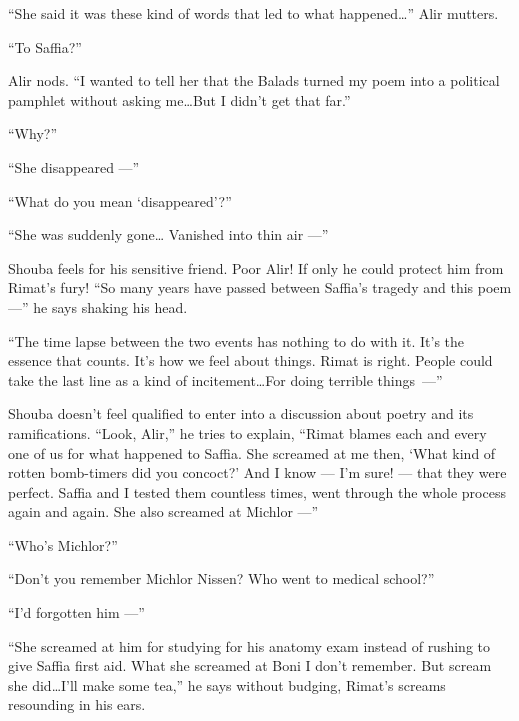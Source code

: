 \documentclass[twoside,11pt,openany]{book}
\begin{document}
``She said it was these kind of words that led to what happened{\ldots}'' Alir mutters.

``To Saffia?''

Alir nods. ``I wanted to tell her that the Balads turned my poem into a political pamphlet without asking
me{\ldots}But I didn't get that far.''

``Why?''

``She disappeared ---''

``What do you mean `disappeared'?''

``She was suddenly gone{\ldots} Vanished into thin air ---''

Shouba feels for his sensitive friend. Poor Alir! If only he could protect him from Rimat's fury! ``So many
years have passed between Saffia's tragedy and this poem ---'' he says shaking his head.

``The time lapse between the two events has nothing to do with it. It's the essence that counts. It's how
we feel about things. Rimat is right. People could take the last line as a kind of incitement{\ldots}For doing terrible
things~---''

Shouba doesn't feel qualified to enter into a discussion about poetry and its{ }ramifications.  ``Look,
Alir,'' he tries to explain, ``Rimat blames each and every one of us for what happened to
Saffia. She screamed at me then, `What kind of rotten bomb-timers did you concoct?' And I know --- I'm sure! --- that they
were perfect. Saffia and I tested them countless times, went through the whole process again and again.  She also
screamed at Michlor ---''

``Who's Michlor?''

``Don't you remember Michlor Nissen? Who went to medical school?''

``I'd forgotten him ---''

``She screamed at him for studying for his anatomy exam instead of rushing to give Saffia first aid. What
she screamed at Boni I don't remember. But scream she did{\ldots}I'll make some tea,'' he says without
budging, Rimat's screams resounding in his ears.
\end{document}
